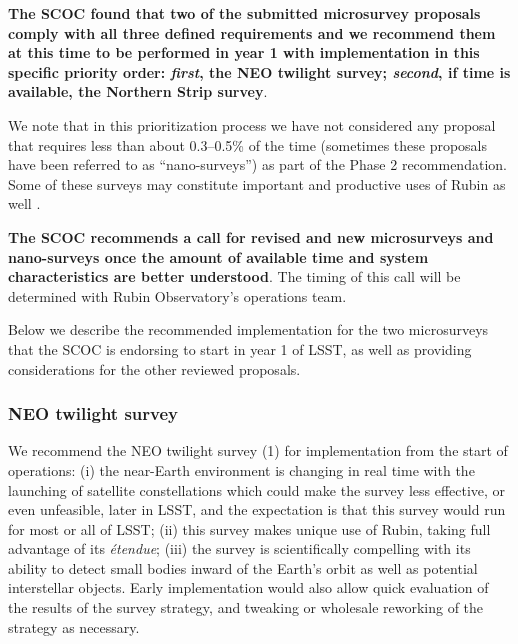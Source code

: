 {\bf The SCOC found that two of the submitted microsurvey proposals comply with all three defined requirements and we recommend them at this time to be performed in year 1 with implementation in this specific priority order: \emph{first}, the NEO twilight survey; \emph{second}, if time is available, the Northern Strip survey}.



We note that in this prioritization process we have not considered any proposal that requires less than about 0.3--0.5\% of the time (sometimes these proposals have been referred to as ``nano-surveys'') as part of the Phase 2 recommendation.  Some of these surveys may constitute important and productive uses of Rubin as well .

\textbf{The SCOC recommends a call for revised and new microsurveys and nano-surveys once the amount of available time and system characteristics are better understood}. The timing of this call will be determined with Rubin Observatory's operations team.

Below we describe the recommended implementation for the two microsurveys that the SCOC is endorsing to start in year 1 of LSST, as well as providing considerations for the other reviewed proposals.

\subsubsection{NEO twilight survey}
We recommend the NEO twilight survey (1) for implementation from the start of operations: (i) the near-Earth environment is changing in real time with the launching of satellite constellations which could make the survey less effective, or even unfeasible, later in LSST, and the expectation is that this survey would run for most or all of LSST; (ii) this survey makes unique use of Rubin, taking full advantage of its \textit{étendue}; (iii) the survey is scientifically compelling with its ability to detect small bodies inward of the Earth’s orbit as well as potential interstellar objects. 
Early implementation would also allow quick evaluation of the results of the survey strategy, and tweaking or wholesale reworking of the strategy as necessary.


